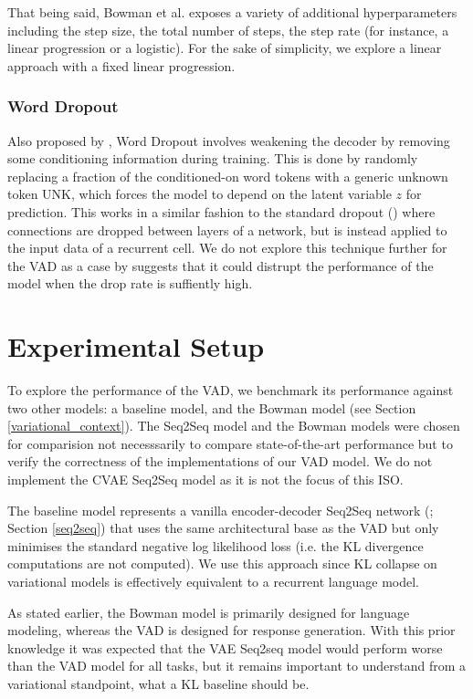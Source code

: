 \documentclass[12pt,twoside]{report}
\begin{document}
That being said, Bowman et al. exposes a variety of additional hyperparameters including the step size, the total number of steps, the step rate (for instance, a linear progression or a logistic). For the sake of simplicity, we explore a linear approach with a fixed linear progression.

\subsection{Word Dropout}
Also proposed by \cite{bowman_generating_2015}, Word Dropout involves weakening the decoder by removing some conditioning information during training. This is done by randomly replacing a fraction of the conditioned-on word tokens with a generic unknown token UNK, which forces the model to depend on the latent variable $z$ for prediction. This works in a similar fashion to the standard dropout (\cite{srivastava_dropout:_2014}) where connections are dropped between layers of a network, but is instead applied to the input data of a recurrent cell. We do not explore this technique further for the VAD as a case by \cite{bowman_generating_2015} suggests that it could distrupt the performance of the model when the drop rate is suffiently high.

\chapter{Experimental Setup}

To explore the performance of the VAD, we benchmark its performance against two other models: a baseline model, and the Bowman model (see Section \ref{variational_context}). The Seq2Seq model and the Bowman models were chosen for comparision not necesssarily to compare state-of-the-art performance but to verify the correctness of the implementations of our VAD model. We do not implement the CVAE Seq2Seq model as it is not the focus of this ISO.

The baseline model represents a vanilla encoder-decoder Seq2Seq network (\cite{sutskever_sequence_2014}; Section \ref{seq2seq}) that uses the same architectural base as the VAD but only minimises the standard negative log likelihood loss (i.e. the KL divergence computations are not computed). We use this approach since KL collapse on variational models is effectively equivalent to a recurrent language model.

As stated earlier, the Bowman model is primarily designed for language modeling, whereas the VAD is designed for response generation. With this prior knowledge it was expected that the VAE Seq2seq model would perform worse than the VAD model for all tasks, but it remains important to understand from a variational standpoint, what a KL baseline should be.
\end{document}

